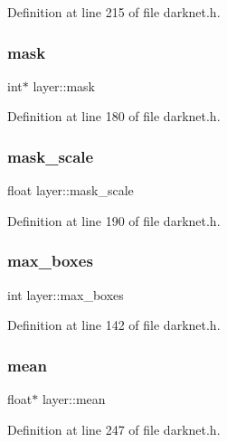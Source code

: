 Definition at line 215 of file darknet.\+h.

\mbox{\label{structlayer_aaa82c8e027d08dfd571c663653f85588}} 
\subsubsection{\texorpdfstring{mask}{mask}}
{\footnotesize\ttfamily int$\ast$ layer\+::mask}



Definition at line 180 of file darknet.\+h.

\mbox{\label{structlayer_a9e6e9d0cbdfbef34920e842d0542670e}} 
\subsubsection{\texorpdfstring{mask\_scale}{mask\_scale}}
{\footnotesize\ttfamily float layer\+::mask\+\_\+scale}



Definition at line 190 of file darknet.\+h.

\mbox{\label{structlayer_a97f045f2c42981c7d1b9e47b8c69788f}} 
\subsubsection{\texorpdfstring{max\_boxes}{max\_boxes}}
{\footnotesize\ttfamily int layer\+::max\+\_\+boxes}



Definition at line 142 of file darknet.\+h.

\mbox{\label{structlayer_a57e3ce10060c51c846086d20944f2448}} 
\subsubsection{\texorpdfstring{mean}{mean}}
{\footnotesize\ttfamily float$\ast$ layer\+::mean}



Definition at line 247 of file darknet.\+h.

